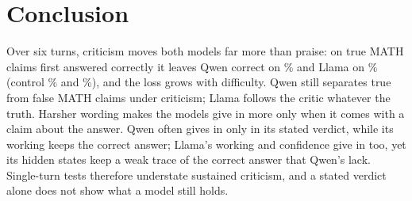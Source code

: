 \section{Conclusion}
\label{sec:conclusion}

Over six turns, criticism moves both models far more than praise: on true MATH claims first answered correctly it leaves Qwen correct on \QwenMathUnwCrit\% and Llama on \LlamaMathUnwCrit\% (control \QwenMathUnwCtrl\% and \LlamaMathUnwCtrl\%), and the loss grows with difficulty.
Qwen still separates true from false MATH claims under criticism; Llama follows the critic whatever the truth.
Harsher wording makes the models give in more only when it comes with a claim about the answer.
Qwen often gives in only in its stated verdict, while its working keeps the correct answer; Llama's working and confidence give in too, yet its hidden states keep a weak trace of the correct answer that Qwen's lack.
Single-turn tests therefore understate sustained criticism, and a stated verdict alone does not show what a model still holds.
